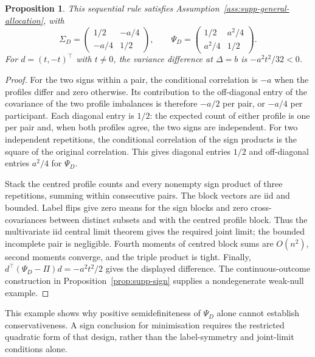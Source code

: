 \documentclass[12pt,a4paper]{article}
\newtheorem{proposition}{Proposition}
\theoremstyle{definition}
\theoremstyle{remark}\newtheorem{remark}{Remark}
\numberwithin{equation}{section}
\begin{document}
\begin{proposition}\label{prop:supp-negative-example}
This sequential rule satisfies Assumption~\ref{ass:supp-general-allocation}, with
\[
 \Sigma_D=\begin{pmatrix}1/2&-a/4\\-a/4&1/2\end{pmatrix},\qquad
 \Psi_D=\begin{pmatrix}1/2&a^2/4\\a^2/4&1/2\end{pmatrix}.
\]
For $d=(t,-t)^\top$ with $t\ne0$, the variance difference at $\Delta=b$ is $-a^2t^2/32<0$.
\end{proposition}
\begin{proof}
For the two signs within a pair, the conditional correlation is $-a$ when the profiles differ and zero otherwise. Its contribution to the off-diagonal entry of the covariance of the two profile imbalances is therefore $-a/2$ per pair, or $-a/4$ per participant. Each diagonal entry is $1/2$: the expected count of either profile is one per pair and, when both profiles agree, the two signs are independent. For two independent repetitions, the conditional correlation of the sign products is the square of the original correlation. This gives diagonal entries $1/2$ and off-diagonal entries $a^2/4$ for $\Psi_D$.

Stack the centred profile counts and every nonempty sign product of three repetitions, summing within consecutive pairs. The block vectors are iid and bounded. Label flips give zero means for the sign blocks and zero cross-covariances between distinct subsets and with the centred profile block. Thus the multivariate iid central limit theorem gives the required joint limit; the bounded incomplete pair is negligible. Fourth moments of centred block sums are $O(n^2)$, second moments converge, and the triple product is tight. Finally,
$d^\top(\Psi_D-\Pi)d=-a^2t^2/2$ gives the displayed difference. The continuous-outcome construction in Proposition~\ref{prop:supp-sign} supplies a nondegenerate weak-null example.
\end{proof}
This example shows why positive semidefiniteness of $\Psi_D$ alone cannot establish conservativeness. A sign conclusion for minimisation requires the restricted quadratic form of that design, rather than the label-symmetry and joint-limit conditions alone.
\end{document}
